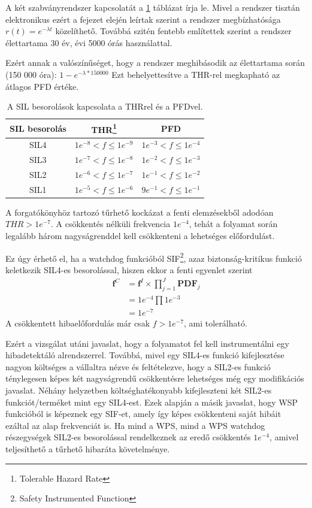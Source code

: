 A két szabványrendszer kapcsolatát a \ref{tab:sil_thr_pfd} táblázat írja le.
Mivel a rendszer tisztán elektronikus ezért a fejezet elején leírtak szerint a rendszer megbízhatósága $r(t) = e^{-\lambda t}$ közelíthető.
Továbbá szitén fentebb említettek szerint a rendszer élettartama 30 év, évi 5000 órás használattal.

Ezért annak a valószínűséget, hogy a rendszer meghibásodik az élettartama során (150 000 óra): $1-e^{-\lambda*150000}$
Ezt behelyettesítve a THR-rel megkapható az átlagos PFD értéke.

\begin{table}
    \footnotesize
    \centering
    \begin{tabular}{ |c|c|c| }
        \hline
        SIL besorolás & THR\footnote{Tolerable Hazard Rate} & PFD \\
        \hline
        SIL4 & $1e^{-8} < f \leq 1e^{-9}$ & $1e^{-3} < f \leq 1e^{-4}$ \\
        \hline
        SIL3 & $1e^{-7} < f \leq 1e^{-8}$ & $1e^{-2} < f \leq 1e^{-3}$ \\
        \hline
        SIL2 & $1e^{-6} < f \leq 1e^{-7}$ & $1e^{-1} < f \leq 1e^{-2}$ \\
        \hline
        SIL1 & $1e^{-5} < f \leq 1e^{-6}$ & $9e^{-1} < f \leq 1e^{-1}$ \\
        \hline
    \end{tabular}
    \caption{A SIL besorolások kapcsolata a THRrel és a PFDvel.}
    \label{tab:sil_thr_pfd}
\end{table}

A forgatókönyhöz tartozó tűrhető kockázat a fenti elemzésekből adodóan ${THR} > 1e^{-7}$.
A csökkentés nélküli frekvencia $1e^{-4}$, tehát a folyamat során legalább három nagyságrenddel kell csökkenteni a lehetséges előfordulást.

Ez úgy érhető el, ha a watchdog funkcióból SIF\footnote{Safety Instrumented Function}, azaz biztonság-kritikus funkció keletkezik SIL4-es besorolással, hiszen ekkor a fenti egyenlet szerint
\begin{align}
    \mathbf{f}^C&= \mathbf{f}^I\times \prod^{J}_{j=1}{\mathbf{PDF}_{j}} \\
     &= 1e^{-4}\prod 1e^{-3} \\
     &= 1e^{-7}
\end{align}
A csökkentett hibaelőfordulás már csak $f > 1e^{-7}$, ami tolerálható.

Ezért a vizsgálat utáni javaslat, hogy a folyamatot fel kell instrumentálni egy hibadetektáló alrendszerrel.
Továbbá, mivel egy SIL4-es funkció kifejlesztése nagyon költséges a vállaltra nézve és feltételezve, hogy a SIL2-es funkció ténylegesen képes két nagyságrendű csökkentésre lehetséges még egy modifikációs javaslat.
Néhány helyzetben költséghatékonyabb kifejleszteni két SIL2-es funkciót/terméket mint egy SIL4-est.
Ezek alapján a másik javaslat, hogy WSP funkcióból is képeznek egy SIF-et, amely így képes csökkenteni saját hibáit ezáltal az alap frekvenciát is.
Ha mind a WPS, mind a WPS watchdog részegységek SIL2-es besorolással rendelkeznek az eredő csökkentés $1e^{-4}$, amivel teljesíthető a tűrhető hibaráta követelménye.
